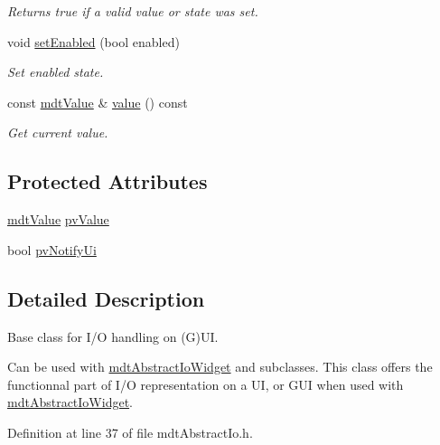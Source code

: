\begin{DoxyCompactItemize}
\begin{DoxyCompactList}\small\item\em Returns true if a valid value or state was set. \end{DoxyCompactList}\item 
void \hyperlink{classmdt_abstract_io_a64f31b1d9abdec6d0b0cc05a2fe1f31b}{set\-Enabled} (bool enabled)
\begin{DoxyCompactList}\small\item\em Set enabled state. \end{DoxyCompactList}\item 
const \hyperlink{classmdt_value}{mdt\-Value} \& \hyperlink{classmdt_abstract_io_a839b0d3a4a1d4616e5b20d744c5f75a1}{value} () const 
\begin{DoxyCompactList}\small\item\em Get current value. \end{DoxyCompactList}\end{DoxyCompactItemize}
\subsection*{Protected Attributes}
\begin{DoxyCompactItemize}
\item 
\hyperlink{classmdt_value}{mdt\-Value} \hyperlink{classmdt_abstract_io_ab955fdb5b2f6491917670a84752b823f}{pv\-Value}
\item 
bool \hyperlink{classmdt_abstract_io_aa2dc002fc045276fac33f44fb20f6974}{pv\-Notify\-Ui}
\end{DoxyCompactItemize}


\subsection{Detailed Description}
Base class for I/\-O handling on (G)U\-I. 

Can be used with \hyperlink{classmdt_abstract_io_widget}{mdt\-Abstract\-Io\-Widget} and subclasses. This class offers the functionnal part of I/\-O representation on a U\-I, or G\-U\-I when used with \hyperlink{classmdt_abstract_io_widget}{mdt\-Abstract\-Io\-Widget}. 

Definition at line 37 of file mdt\-Abstract\-Io.\-h.



